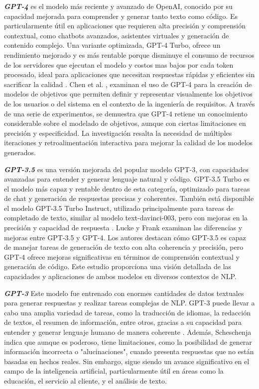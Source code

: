 \textit{\textbf{GPT-4}} es el modelo más reciente y avanzado de OpenAI, conocido por su capacidad mejorada para comprender y generar tanto texto como código. Es particularmente útil en aplicaciones que requieren alta precisión y comprensión contextual, como chatbots avanzados, asistentes virtuales y generación de contenido complejo. Una variante optimizada, GPT-4 Turbo, ofrece un rendimiento mejorado y es más rentable porque disminuye el consumo de recursos de los servidores que ejecutan el modelo y costos mas bajos por cada token procesado, ideal para aplicaciones que necesitan respuestas rápidas y eficientes sin sacrificar la calidad \cite{Elon2024}. Chen et al. \cite{Chen2023}, examinan el uso de GPT-4 para la creación de modelos de objetivos que permiten definir y representar visualmente los objetivos de los usuarios o del sistema en el contexto de la ingeniería de requisitos. A través de una serie de experimentos, se demuestra que GPT-4 retiene un conocimiento considerable sobre el modelado de objetivos, aunque con ciertas limitaciones en precisión y especificidad. La investigación resalta la necesidad de múltiples iteraciones y retroalimentación interactiva para mejorar la calidad de los modelos generados.

\textbf{\textit{GPT-3.5}} es una versión mejorada del popular modelo GPT-3, con capacidades avanzadas para entender y generar lenguaje natural y código. GPT-3.5 Turbo es el modelo más capaz y rentable dentro de esta categoría, optimizado para tareas de chat y generación de respuestas precisas y coherentes. También está disponible el modelo GPT-3.5 Turbo Instruct, utilizado principalmente para tareas de completado de texto, similar al modelo text-davinci-003, pero con mejoras en la precisión y capacidad de respuesta \cite{Elon2024}. Lucke y Frank  \cite{Lucke2024} examinan las diferencias y mejoras entre GPT-3.5 y GPT-4. Los autores destacan cómo GPT-3.5 es capaz de manejar tareas de generación de texto con alta coherencia y precisión, pero GPT-4 ofrece mejoras significativas en términos de comprensión contextual y generación de código. Este estudio proporciona una visión detallada de las capacidades y aplicaciones de ambos modelos en diversos contextos de NLP.

\textbf{\textit{GPT-3}} Este modelo fue entrenado con enormes cantidades de datos textuales para generar respuestas y realizar tareas complejas de NLP. GPT-3 puede llevar a cabo una amplia variedad de tareas, como la traducción de idiomas, la redacción de textos, el resumen de información, entre otros, gracias a su capacidad para entender y generar lenguaje humano de manera coherente \cite{Scheschenja2024}. Además, Scheschenja \cite{Scheschenja2024} indica que aunque es poderoso, tiene limitaciones, como la posibilidad de generar información incorrecta o "alucinaciones", cuando presenta respuestas que no están basadas en hechos reales. Sin embargo, sigue siendo un avance significativo en el campo de la inteligencia artificial, particularmente útil en áreas como la educación, el servicio al cliente, y el análisis de texto.

